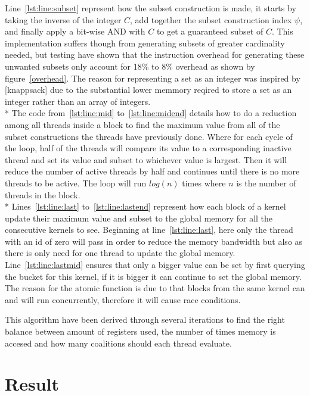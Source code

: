 \documentclass[a4paper, 12pt]{report}
\begin{document}
Line~\ref{lst:line:subset} represent how the subset construction is made, it starts by taking the inverse of the integer $C$, 
add together the subset construction index $\psi$, and finally apply a bit-wise AND with $C$ to get a guaranteed subset of $C$.
This implementation suffers though from generating subsets of greater cardinality needed, 
but testing have shown that the instruction overhead for generating these unwanted subsets only account for 18\% to 8\% overhead as shown by figure~\ref{overhead}.
The reason for representing a set as an integer was inspired by [knappsack] due to the substantial lower memmory reqired to store a set as an integer rather than an array of integers.\\*
The code from~\ref{lst:line:mid} to~\ref{lst:line:midend} details how to do a reduction among all threads 
inside a block to find the maximum value from all of the subset constructions the threads have previously done.
Where for each cycle of the loop, half of the threads will compare its value to a corresponding inactive thread and set its value and subset to whichever value is largest.
Then it will reduce the number of active threads by half and continues until there is no more threads to be active.
The loop will run $log(n)$ times where $n$ is the number of threads in the block.\\* 
Lines~\ref{lst:line:last} to~\ref{lst:line:lastend} represent how each block of a kernel update their maximum value and subset to the global memory for all the consecutive kernels to see.
Beginning at line~\ref{lst:line:last}, here only the thread with an id of zero will pass in order to reduce the memory bandwidth but also as there is only need for one thread to update the global memory.
Line~\ref{lst:line:lastmid} ensures that only a bigger value can be set by first querying the bucket for this kernel, if it is bigger it can continue to set the global memory.
The reason for the atomic function is due to that blocks from the same kernel can and will run concurrently, therefore it will cause race conditions.

This algorithm have been derived through several iterations to find the right balance between amount of registers used, 
the number of times memory is accesed and how many coalitions should each thread evaluate. 
\section{Result}
\end{document}
